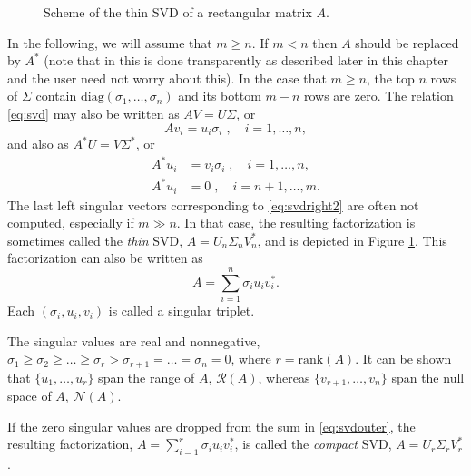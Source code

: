 \begin{figure}
\centering
{}
\caption{\label{fig:svd}Scheme of the thin SVD of a rectangular matrix $A$.}
\end{figure}

In the following, we will assume that $m\geq n$. If $m<n$ then $A$ should be replaced by $A^*$ (note that in \slepc this is done transparently as described later in this chapter and the user need not worry about this). In the case that $m\geq n$, the top $n$ rows of $\Sigma$ contain $\mathrm{diag}(\sigma_1,\ldots,\sigma_n)$ and its bottom $m-n$ rows are zero. The relation \eqref{eq:svd} may also be written as $AV=U\Sigma$, or
\begin{equation}
\label{eq:svdleft}
Av_i=u_i\sigma_i\;,\quad i=1,\ldots,n,
\end{equation}
and also as $A^*U=V\Sigma^*$, or
\begin{align}
\label{eq:svdright}
A^*u_i&=v_i\sigma_i\;,\quad i=1,\ldots,n,\\
\label{eq:svdright2}
A^*u_i&=0\;,\quad i=n+1,\ldots,m.
\end{align}
The last left singular vectors corresponding to \eqref{eq:svdright2} are often not computed, especially if $m\gg n$. In that case, the resulting factorization is sometimes called the \emph{thin} SVD, $A=U_n\Sigma_n V_n^*$, and is depicted in Figure \ref{fig:svd}. This factorization can also be written as
\begin{equation}
\label{eq:svdouter}
A=\sum_{i=1}^{n}\sigma_iu_iv_i^*.
\end{equation}
Each $(\sigma_i,u_i,v_i)$ is called a singular triplet.

The singular values are real and nonnegative, $\sigma_1\geq\sigma_2\geq\ldots\geq\sigma_r>\sigma_{r+1}=\ldots=\sigma_n=0$, where $r=\mathrm{rank}(A)$. It can be shown that $\{u_1,\ldots,u_r\}$ span the range of $A$, $\mathcal{R}(A)$, whereas $\{v_{r+1},\ldots,v_n\}$ span the null space of $A$, $\mathcal{N}(A)$.

If the zero singular values are dropped from the sum in \eqref{eq:svdouter}, the resulting factorization, $A=\sum_{i=1}^{r}\sigma_iu_iv_i^*$, is called the \emph{compact} SVD, $A=U_r\Sigma_r V_r^*$.

